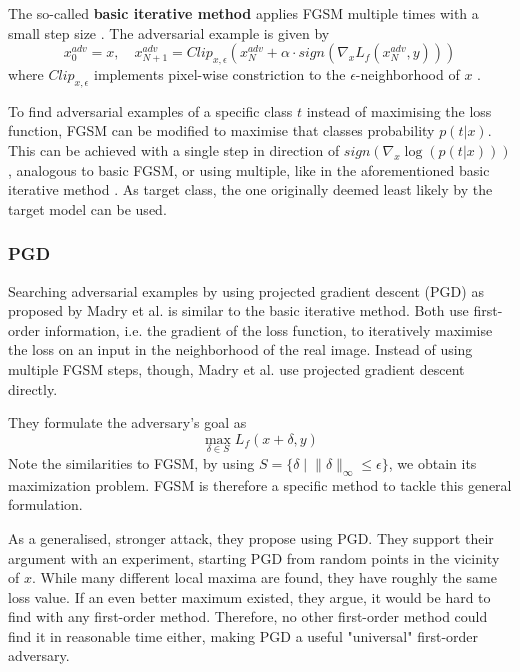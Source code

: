 \documentclass[review]{AIM_report}
\begin{document}
The so-called \textbf{basic iterative method} applies FGSM multiple times with a small step size \cite{kurakin2017physical}. The adversarial example is given by
\[
x_{0}^{adv} = x, \quad x_{N+1}^{adv} = Clip_{x,\epsilon}
(
x_{N}^{adv} + \alpha \cdot sign(\nabla_x L_f(x_{N}^{adv} , y))
)
\]
where \(Clip_{x,\epsilon}\) implements pixel-wise constriction to the \(\epsilon\)-neighborhood of \(x\) \cite{kurakin2017physical}.

To find adversarial examples of a specific class \(t\) instead of maximising the loss function, FGSM can be modified to maximise that classes probability \(p(t | x)\). This can be achieved with a single step in direction of \(sign(\nabla_x \log(p(t | x)))\) \cite{kurakin2017physical}
, analogous to basic FGSM, or using multiple, like in the aforementioned basic iterative method \cite{kurakin2016adversarial}. As target class, the one originally deemed least likely by the target model can be used. 




\subsubsection{PGD} \label{PGD}
Searching adversarial examples by using projected gradient descent (PGD) as proposed by Madry et al. \cite{madry2017towards} is similar to the basic iterative method. Both use first-order information, i.e. the gradient of the loss function, to iteratively maximise the loss on an input in the neighborhood of the real image.
Instead of using multiple FGSM steps, though, Madry et al. use projected gradient descent directly. 

They formulate the adversary's goal as
\[
\max_{\delta\in S}L_f(x+\delta, y)
\]
Note the similarities to FGSM, by using \(S=\{\delta \mid \lVert \delta \rVert_\infty \leq \epsilon\}\), we obtain its maximization problem. FGSM is therefore a specific method to tackle this general formulation.

As a generalised, stronger attack, they propose using PGD. They support their argument with an experiment, starting PGD from random points in the vicinity of \(x\). While many different local maxima are found, they have roughly the same loss value. If an even better maximum existed, they argue, it would be hard to find with any first-order method. Therefore, no other first-order method could find it in reasonable time either, making PGD a useful "universal" first-order adversary.
\end{document}
